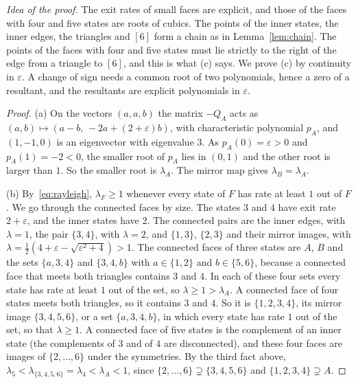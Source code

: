 \documentclass[EJP,preprint]{ejpecp}
\begin{document}
\emph{Idea of the proof.} The exit rates of small faces are explicit, and
those of the faces with four and five states are roots of cubics. The points
of the inner states, the inner edges, the triangles and $[6]$ form a chain as
in Lemma~\ref{lem:chain}. The points of the faces with four and five states
must lie strictly to the right of the edge from a triangle to $[6]$, and this
is what (c) says. We prove (c) by continuity in
$\varepsilon$. A change of sign needs a common root of two polynomials, hence a
zero of a resultant, and the resultants are explicit polynomials in
$\varepsilon$.

\begin{proof}
(a) On the vectors $(a,a,b)$ the matrix $-Q_A$ acts as
$(a,b)\mapsto(a-b,\,-2a+(2+\varepsilon)b)$, with characteristic polynomial
$p_A$, and $(1,-1,0)$ is an eigenvector with eigenvalue $3$. As
$p_A(0)=\varepsilon>0$ and $p_A(1)=-2<0$, the smaller root of $p_A$ lies in
$(0,1)$ and the other root is larger than $1$. So the smaller root is
$\lambda_A$. The mirror map gives $\lambda_B=\lambda_A$.

(b) By~\eqref{eq:rayleigh}, $\lambda_F\ge1$ whenever every state of $F$ has
rate at least $1$ out of $F$. We go through the connected faces by size. The
states $3$ and $4$ have exit rate $2+\varepsilon$, and the inner states have
$2$. The connected pairs are the inner edges, with $\lambda=1$, the pair
$\{3,4\}$, with $\lambda=2$, and $\{1,3\}$, $\{2,3\}$ and their mirror images,
with $\lambda=\frac12(4+\varepsilon-\sqrt{\varepsilon^2+4})>1$. The connected
faces of three states are $A$, $B$ and the sets $\{a,3,4\}$ and $\{3,4,b\}$
with $a\in\{1,2\}$ and $b\in\{5,6\}$, because a connected face that meets both
triangles contains $3$ and $4$. In each of these four sets every state has
rate at least $1$ out of the set, so $\lambda\ge1>\lambda_A$. A connected face
of four states meets both triangles, so it contains $3$ and $4$. So it is
$\{1,2,3,4\}$, its mirror image $\{3,4,5,6\}$, or a set $\{a,3,4,b\}$, in which every state has rate $1$ out
of the set, so that $\lambda\ge1$. A connected face of five states is the
complement of an inner state (the complements of $3$ and of $4$ are
disconnected), and these four faces are images of $\{2,\dots,6\}$
under the symmetries. By the third fact above,
$\lambda_5<\lambda_{\{3,4,5,6\}}=\lambda_4<\lambda_A<1$, since
$\{2,\dots,6\}\supsetneq\{3,4,5,6\}$ and $\{1,2,3,4\}\supsetneq A$.


\end{proof}
\end{document}
